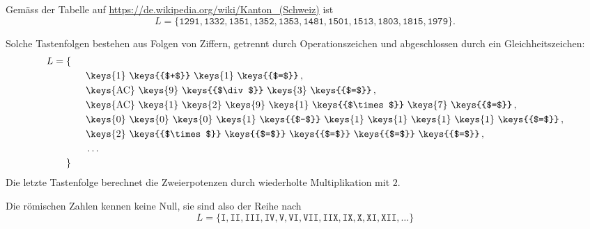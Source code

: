\begin{loesung}
\begin{teilaufgaben}
\item Gemäss der Tabelle auf
\url{https://de.wikipedia.org/wiki/Kanton_(Schweiz)}
ist 
\[
L=\{
\texttt{1291},
\texttt{1332},
\texttt{1351},
\texttt{1352},
\texttt{1353},
\texttt{1481},
\texttt{1501},
\texttt{1513},
\texttt{1803},
\texttt{1815},
\texttt{1979}
\}.
\]
\item
Solche Tastenfolgen bestehen aus Folgen von Ziffern, getrennt durch
Operationszeichen
und abgeschlossen durch ein Gleichheitszeichen:
\begin{align*}
L=\mathstrut&\{
\\
&\qquad
\text{\keys{1} \keys{{$+$}} \keys{1} \keys{{$=$}}}\,,
\\
&\qquad
\text{\keys{AC} \keys{9} \keys{{$\div$}} \keys{3} \keys{{$=$}}}\,,
\\
&\qquad
\text{\keys{AC} \keys{1} \keys{2} \keys{9} \keys{1}
\keys{{$\times$}} \keys{7} \keys{{$=$}}}\,,
\\
&\qquad
\text{\keys{0} \keys{0} \keys{0} \keys{1}
\keys{{$-$}}
\keys{1} \keys{1} \keys{1} \keys{1}
\keys{{$=$}}}\,,
\\
&\qquad
\text{\keys{2}
\keys{{$\times$}}
\keys{{$=$}}
\keys{{$=$}}
\keys{{$=$}}
\keys{{$=$}}}\,,
\\
&\qquad\dots
\\
&\}
\end{align*}
Die letzte Tastenfolge berechnet die Zweierpotenzen durch wiederholte 
Multiplikation mit $2$.
\item
Die römischen Zahlen kennen keine Null, sie sind also der Reihe nach
\[
L=\{
\texttt{I},
\texttt{II},
\texttt{III},
\texttt{IV},
\texttt{V},
\texttt{VI},
\texttt{VII},
\texttt{IIX},
\texttt{IX},
\texttt{X},
\texttt{XI},
\texttt{XII},
\dots
\}
\]
\end{teilaufgaben}
\end{loesung}
